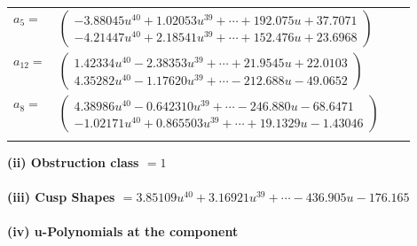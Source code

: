 \documentclass[1p]{elsarticle_modified}
\theoremstyle{definition}
\begin{document}
\begin{tabular}{m{7pt} m{180pt} m{7pt} m{180pt} }
\flushright $a_{5}=$&$\begin{pmatrix}-3.88045 u^{40}+1.02053 u^{39}+\cdots+192.075 u+37.7071\\-4.21447 u^{40}+2.18541 u^{39}+\cdots+152.476 u+23.6968\end{pmatrix}$ \\
\flushright $a_{12}=$&$\begin{pmatrix}1.42334 u^{40}-2.38353 u^{39}+\cdots+21.9545 u+22.0103\\4.35282 u^{40}-1.17620 u^{39}+\cdots-212.688 u-49.0652\end{pmatrix}$ \\
\flushright $a_{8}=$&$\begin{pmatrix}4.38986 u^{40}-0.642310 u^{39}+\cdots-246.880 u-68.6471\\-1.02171 u^{40}+0.865503 u^{39}+\cdots+19.1329 u-1.43046\end{pmatrix}$\\&\end{tabular}
\flushleft \textbf{(ii) Obstruction class $= 1$}\\~\\
\flushleft \textbf{(iii) Cusp Shapes $= 3.85109 u^{40}+3.16921 u^{39}+\cdots-436.905 u-176.165$}\\~\\
\newpage\renewcommand{\arraystretch}{1}
\flushleft \textbf{(iv) u-Polynomials at the component}\newline \\
\end{document}
